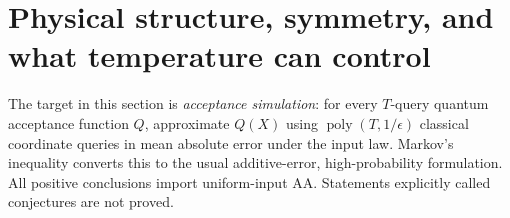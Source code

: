 \section{Physical structure, symmetry, and what temperature can control}
\label{proof:threshold_physics}

The target in this section is \emph{acceptance simulation}: for every
\(T\)-query quantum acceptance function \(Q\), approximate \(Q(X)\)
using \(\operatorname{poly}(T,1/\epsilon)\) classical coordinate queries
in mean absolute error under the input law. Markov's inequality converts
this to the usual additive-error, high-probability formulation. All
positive conclusions import uniform-input AA. Statements explicitly
called conjectures are not proved.






